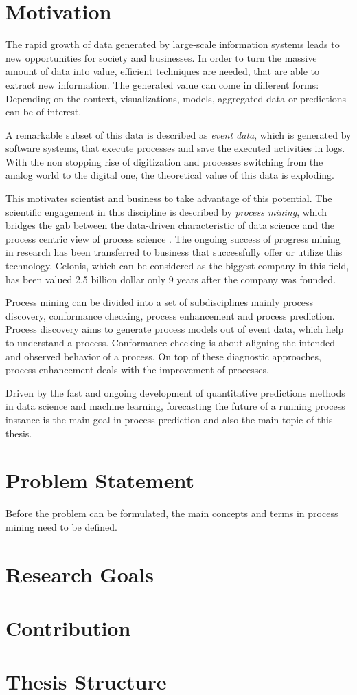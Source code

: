 


\section{Motivation}

The rapid growth of data generated by large-scale information systems leads to new opportunities for  society and businesses.
In order to turn the massive amount of data into value, efficient techniques are needed, that are able to extract new information.
The generated value can come in different forms: Depending on the context, visualizations, models, aggregated data or predictions can be of interest. 

A remarkable subset of this data is described as \textit{event data}, which is generated by software systems, that execute processes and save the executed activities in logs.
With the non stopping rise of digitization and processes switching from the analog world to the digital one, the theoretical value of this data is exploding.

This motivates scientist and business to take advantage of this potential.
The scientific engagement in this discipline is described by \textit{process mining}, which bridges the gab between the data-driven characteristic of data science and the process centric view of process science \cite{DBLP:books/sp/Aalst16}.
The ongoing success of progress mining in research has been transferred to business that successfully offer or utilize this technology.
Celonis, which can be considered as the biggest company in this field, has been valued 2.5 billion dollar only 9 years after the company was founded.

Process mining can be divided into a set of subdisciplines mainly process discovery, conformance checking, process enhancement and process prediction.
Process discovery aims to generate process models out of event data, which help to understand a process.
Conformance checking is about aligning the intended and observed behavior of a process. 
On top of these diagnostic approaches, process enhancement deals with the improvement of processes.

Driven by the fast and ongoing development of quantitative predictions methods in data science and machine learning, forecasting the future of a running process instance is the main goal in process prediction and also the main topic of this thesis.

\section{Problem Statement}

Before the problem can be formulated, the main concepts and terms in process mining need to be defined.



\section{Research Goals}

\section{Contribution}

\section{Thesis Structure}